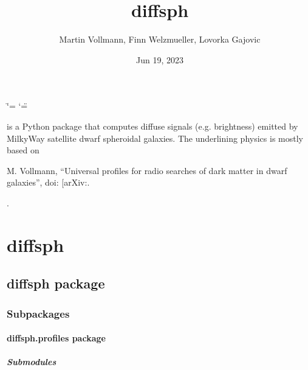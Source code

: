 \documentclass[letterpaper,10pt,english]{sphinxmanual}
\title{diffsph}
\date{Jun 19, 2023}
\author{Martin Vollmann, Finn Welzmueller, Lovorka Gajovic}
\begin{document}
\ifdefined\shorthandoff
  \ifnum\catcode`\=\string=\active\shorthandoff{=}\fi
  \ifnum\catcode`\"=\active{}\fi
\fi

\pagestyle{empty}
\sphinxmaketitle
\pagestyle{plain}
\sphinxtableofcontents
\pagestyle{normal}
\label{\detokenize{index::doc}}


\sphinxAtStartPar
{} is a Python package that computes diffuse signals (e.g. brightness) emitted by Milky\sphinxhyphen{}Way satellite dwarf spheroidal galaxies. The underlining physics is mostly based on %
\begin{footnote}[1]\sphinxAtStartFootnote
M. Vollmann, “Universal profiles for radio searches of dark matter in dwarf galaxies”,
doi:
{[}arXiv:\sphinxhref{https://arxiv.org/abs/2011.11947}{2011.11947 {[}astro\sphinxhyphen{}ph.HE{]}}{]}.
%
\end{footnote}.

\sphinxstepscope


\chapter{diffsph}
\label{\detokenize{modules:diffsph}}\label{\detokenize{modules::doc}}
\sphinxstepscope


\section{diffsph package}
\label{\detokenize{diffsph:diffsph-package}}\label{\detokenize{diffsph::doc}}

\subsection{Subpackages}
\label{\detokenize{diffsph:subpackages}}
\sphinxstepscope


\subsubsection{diffsph.profiles package}
\label{\detokenize{diffsph.profiles:diffsph-profiles-package}}\label{\detokenize{diffsph.profiles::doc}}

\paragraph{Submodules}
\label{\detokenize{diffsph.profiles:submodules}}
\end{document}
